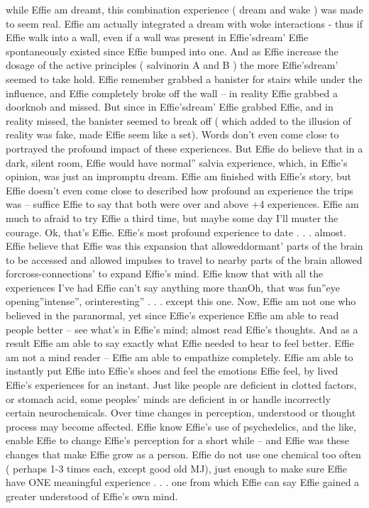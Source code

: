 \documentclass[12pt]{book}
\begin{document}
while Effie am dreamt, this combination experience ( dream and wake ) was made to seem real. Effie am actually integrated a dream with woke interactions - thus if Effie walk into a wall, even if a wall was present in Effie'sdream' Effie spontaneously existed since Effie bumped into one. And as Effie increase the dosage of the active principles ( salvinorin A and B ) the more Effie'sdream' seemed to take hold. Effie remember grabbed a banister for stairs while under the influence, and Effie completely broke off the wall -- in reality Effie grabbed a doorknob and missed. But since in Effie'sdream' Effie grabbed Effie, and in reality missed, the banister seemed to break off ( which added to the illusion of reality was fake, made Effie seem like a set). Words don't even come close to portrayed the profound impact of these experiences. But Effie do believe that in a dark, silent room, Effie would have normal'' salvia experience, which, in Effie's opinion, was just an impromptu dream. Effie am finished with Effie's story, but Effie doesn't even come close to described how profound an experience the trips was -- suffice Effie to say that both were over and above +4 experiences. Effie am much to afraid to try Effie a third time, but maybe some day I'll muster the courage. Ok, that's Effie. Effie's most profound experience to date . . .  almost. Effie believe that Effie was this expansion that alloweddormant' parts of the brain to be accessed and allowed impulses to travel to nearby parts of the brain allowed forcross-connections' to expand Effie's mind. Effie know that with all the experiences I've had Effie can't say anything more thanOh, that was fun''eye opening''intense'', orinteresting'' . . .  except this one. Now, Effie am not one who believed in the paranormal, yet since Effie's experience Effie am able to read people better -- see what's in Effie's mind; almost read Effie's thoughts. And as a result Effie am able to say exactly what Effie needed to hear to feel better. Effie am not a mind reader -- Effie am able to empathize completely. Effie am able to instantly put Effie into Effie's shoes and feel the emotions Effie feel, by lived Effie's experiences for an instant. Just like people are deficient in clotted factors, or stomach acid, some peoples' minds are deficient in or handle incorrectly certain neurochemicals. Over time changes in perception, understood or thought process may become affected. Effie know Effie's use of psychedelics, and the like, enable Effie to change Effie's perception for a short while -- and Effie was these changes that make Effie grow as a person. Effie do not use one chemical too often ( perhaps 1-3 times each, except good old MJ), just enough to make sure Effie have ONE meaningful experience . . .  one from which Effie can say Effie gained a greater understood of Effie's own mind.
\end{document}
